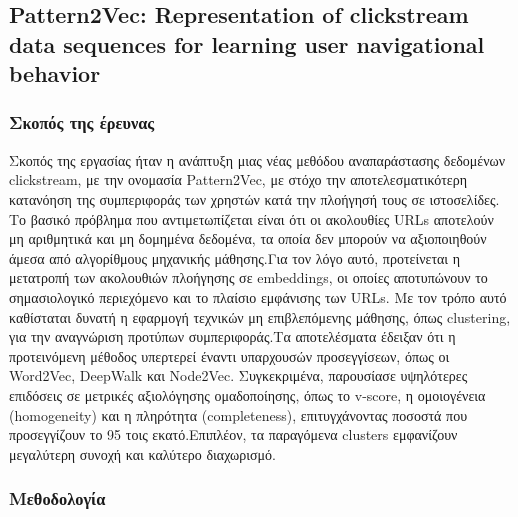 \documentclass[12pt,a4paper]{article}
\begin{document}
	
	\subsection{Pattern2Vec: Representation of clickstream data sequences for
		learning user navigational behavior }
	
	 \subsubsection{Σκοπός της έρευνας}
	 
	 Σκοπός της εργασίας \cite{Pat2Vec} ήταν η ανάπτυξη μιας νέας μεθόδου αναπαράστασης δεδομένων clickstream, με την ονομασία Pattern2Vec, με στόχο την αποτελεσματικότερη κατανόηση της συμπεριφοράς των χρηστών κατά την πλοήγησή τους σε ιστοσελίδες. Το βασικό πρόβλημα που αντιμετωπίζεται είναι ότι οι ακολουθίες URLs αποτελούν μη αριθμητικά και μη δομημένα δεδομένα, τα οποία δεν μπορούν να αξιοποιηθούν άμεσα από αλγορίθμους μηχανικής μάθησης.Για τον λόγο αυτό, προτείνεται η μετατροπή των ακολουθιών πλοήγησης σε embeddings, οι οποίες αποτυπώνουν το σημασιολογικό περιεχόμενο και το πλαίσιο εμφάνισης των URLs. Με τον τρόπο αυτό καθίσταται δυνατή η εφαρμογή τεχνικών μη επιβλεπόμενης μάθησης, όπως clustering, για την αναγνώριση προτύπων συμπεριφοράς.Τα αποτελέσματα έδειξαν ότι η προτεινόμενη μέθοδος υπερτερεί έναντι υπαρχουσών προσεγγίσεων, όπως οι Word2Vec, DeepWalk και Node2Vec. Συγκεκριμένα, παρουσίασε υψηλότερες επιδόσεις σε μετρικές αξιολόγησης ομαδοποίησης, όπως το v-score, η ομοιογένεια (homogeneity) και η πληρότητα (completeness), επιτυγχάνοντας ποσοστά που προσεγγίζουν το 95 τοις εκατό.Επιπλέον, τα παραγόμενα clusters εμφανίζουν μεγαλύτερη συνοχή και καλύτερο διαχωρισμό.
	 
	  \subsubsection{Μεθοδολογία} 
	  
\end{document}
